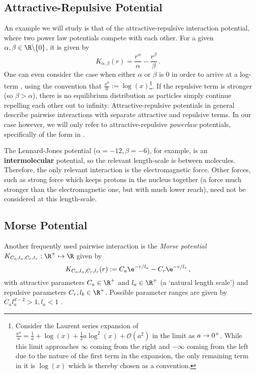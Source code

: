 \subsection{Attractive-Repulsive Potential}
An example we will study is that of the attractive-repulsive interaction potential, where two power law potentials compete with each other.
For a given $\alpha, \beta \in \R \backslash \{0\}$, it is given by
\begin{equation}
  K_{\alpha, \beta}(r) = \frac{r^\alpha}{\alpha} - \frac{r^\beta}{\beta}\,.
  \label{eq:attractive-repulsive-potential}
\end{equation}
One can even consider the case when either $\alpha$ or $\beta$ is 0 in order to arrive at a log-term \parencite{2017-explicit-solutions}, using the convention that $\frac{x^0}{0} := \log(x)$\footnote{
  Consider the Laurent series expansion of $\frac{x^a}{a} = \frac{1}{a} + \log(x) + \frac{1}{2}a \log^2(x) + \mathcal{O}(a^2)$ in the limit as $a \rightarrow 0^+$.
  While this limit approaches $\infty$ coming from the right and $-\infty$ coming from the left due to the nature of the first term in the expansion, the only remaining term in it is $\log(x)$ which is thereby chosen as a convention.
}.
If the repulsive term is stronger (so $\beta > \alpha$), there is no equilibrium distribution as particles simply continue repelling each other out to infinity.
Attractive-repulsive potentials in general describe pairwise interactions with separate attractive and repulsive terms.
In our case however, we will only refer to attractive-repulsive \textit{powerlaw} potentials, specifically of the form in .

The Lennard-Jones potential ($\alpha=-12, \beta=-6$), for example, is an \textbf{intermolecular} potential, so the relevant length-scale is between molecules.
Therefore, the only relevant interaction is the electromagnetic force.
Other forces, such as strong force which keeps protons in the nucleus together (a force much stronger than the electromagnetic one, but with much lower reach), need not be considered at this length-scale.

\subsection{Morse Potential}
Another frequently used pairwise interaction is the \textit{Morse potential} $K_{C_a, l_a, C_r, l_r}: \R^+ \mapsto \R$ given by
\begin{equation}
  K_{C_a, l_a, C_r, l_r}(r) := C_a \e^{-r / l_a} - C_r \e^{-r / l_r}\,,
  \label{eq:morse-potential}
\end{equation}
with attractive parameters $C_a \in \R^+$ and $l_a \in \R^+$ (a `natural length scale') and repulsive parameters $C_r, l_b \in \R^+$.
Possible parameter ranges are given by $C_a l_a^{d-2} > 1, l_a < 1$ \parencite{2006-self-propelled,2014-explicit-flock-solutions-for-quasi-morse-potentials}.
\hierKoennteIhreWerbungStehen

